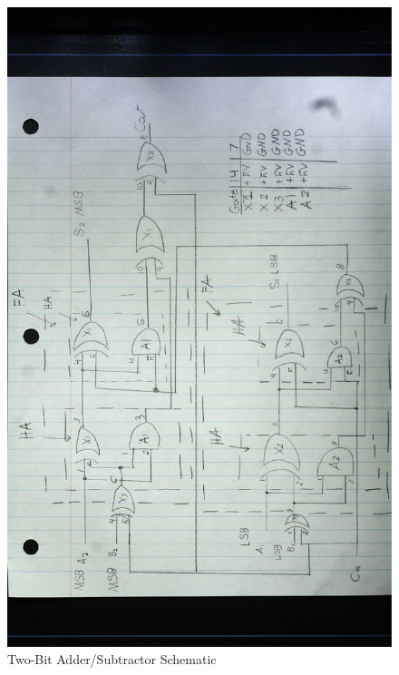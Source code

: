 \documentclass[11pt]{article}
\begin{document}
\begin{center}
	\begin{figure}
		\includegraphics[width=.8\textwidth]{scanj.pdf}
		\caption{Two-Bit Adder/Subtractor Schematic}
	\end{figure}
\end{center}
\end{document}
